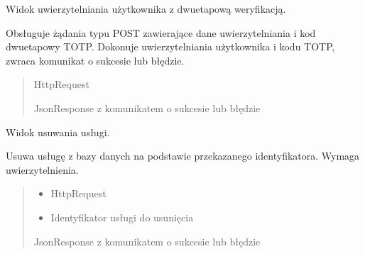 \documentclass[letterpaper,10pt,polish]{sphinxmanual}
\begin{document}

\begin{fulllineitems}
\label{\detokenize{mainApp:mainApp.views.authenticate_view}}
\pysigstartsignatures
{}
\pysigstopsignatures
\sphinxAtStartPar
Widok uwierzytelniania użytkownika z dwuetapową weryfikacją.

\sphinxAtStartPar
Obsługuje żądania typu POST zawierające dane uwierzytelniania i kod dwuetapowy TOTP.
Dokonuje uwierzytelniania użytkownika i kodu TOTP, zwraca komunikat o sukcesie lub błędzie.
\begin{quote}\begin{description}
\sphinxAtStartPar
{} \textendash{} HttpRequest

\sphinxAtStartPar
JsonResponse z komunikatem o sukcesie lub błędzie

\end{description}\end{quote}

\end{fulllineitems}


\begin{fulllineitems}
\label{\detokenize{mainApp:mainApp.views.delete_service}}
\pysigstartsignatures
{}
\pysigstopsignatures
\sphinxAtStartPar
Widok usuwania usługi.

\sphinxAtStartPar
Usuwa usługę z bazy danych na podstawie przekazanego identyfikatora.
Wymaga uwierzytelnienia.
\begin{quote}\begin{description}
\begin{itemize}
\item {} 
\sphinxAtStartPar
{} \textendash{} HttpRequest

\item {} 
\sphinxAtStartPar
{} \textendash{} Identyfikator usługi do usunięcia

\end{itemize}

\sphinxAtStartPar
JsonResponse z komunikatem o sukcesie lub błędzie

\end{description}\end{quote}

\end{fulllineitems}
\end{document}
